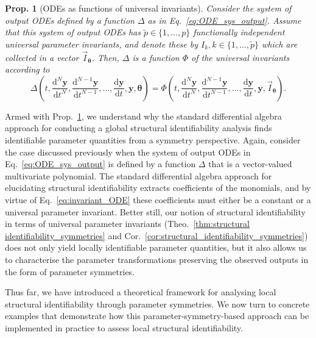 \documentclass[12pt]{article}
\newtheorem{prop}{Prop.}
\begin{document}
\medskip
\begin{prop}[ODEs as functions of universal invariants]
Consider the system of output ODEs defined by a function $\Delta$ as in Eq.~\eqref{eq:ODE_sys_output}. Assume that this system of output ODEs has $\tilde{p}\in\{1,\ldots,p\}$ functionally independent universal parameter invariants, and denote these by $I_{k},k\in\{1,\ldots,\tilde{p}\}$ which are collected in a vector $\vec{I}_{\boldsymbol{\theta}}$. Then, $\Delta$ is a function $\Phi$ of the universal invariants according to
\begin{equation}
\Delta\left(t,\frac{\mathrm{d}^{N}\mathbf{y}}{\mathrm{d}t^{N}},\frac{\mathrm{d}^{N-1}\mathbf{y}}{\mathrm{d}t^{N-1}},\ldots,\frac{\mathrm{d}\mathbf{y}}{\mathrm{d}t},\mathbf{y},\boldsymbol{\theta}\right)=\Phi\left(t,\frac{\mathrm{d}^{N}\mathbf{y}}{\mathrm{d}t^{N}},\frac{\mathrm{d}^{N-1}\mathbf{y}}{\mathrm{d}t^{N-1}},\ldots,\frac{\mathrm{d}\mathbf{y}}{\mathrm{d}t},\mathbf{y},\vec{I}_{\boldsymbol{\theta}}\right).
\label{eq:invariant_ODE}
\end{equation}
\label{prop:ODE}
\end{prop}


Armed with Prop.~\ref{prop:ODE}, we understand why the standard differential algebra approach for conducting a global structural identifiability analysis finds identifiable parameter quantities from a symmetry perspective. Again, consider the case discussed previously when the system of output ODEs in Eq.~\eqref{eq:ODE_sys_output} is defined by a function $\Delta$ that is a vector-valued multivariate polynomial. The standard differential algebra approach for elucidating structural identifiability extracts coefficients of the monomials, and by virtue of Eq.~\eqref{eq:invariant_ODE} these coefficients must either be a constant or a universal parameter invariant. Better still, our notion of structural identifiability in terms of universal parameter invariants (Theo.~\ref{thm:structural identifiability_symmetries} and Cor.~\ref{cor:structural_identifiability_symmetries}) does not only yield locally identifiable parameter quantities, but it also allows us to characterise the parameter transformations preserving the observed outputs in the form of parameter symmetries. 

Thus far, we have introduced a theoretical framework for analysing local structural identifiability through parameter symmetries. We now turn to concrete examples that demonstrate how this parameter-symmetry-based approach can be implemented in practice to assess local structural identifiability.
\end{document}
